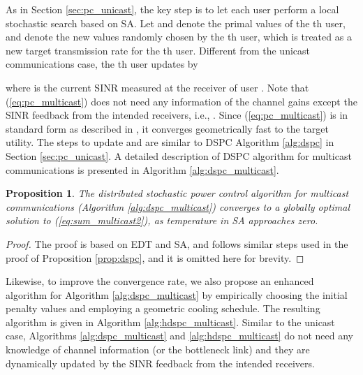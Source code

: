 \documentclass[10pt,journal,letterpaper,compsoc]{IEEEtran}
\newtheorem{prop}{\textbf{Proposition}}[section]
\begin{document}
{{As in Section \ref{sec:pc_unicast}, the key step is to let each user perform a local stochastic search based on SA. Let  and  denote the primal values of the th user, and  denote the new values randomly chosen by the th user, which is treated as a new target transmission rate for the th user. Different from the unicast communications case, the th user updates  by

where  is the current SINR measured at the receiver  of user . Note that (\ref{eq:pc_multicast}) does not need any information of the channel gains except the SINR feedback from the intended receivers, i.e.,  .  Since (\ref{eq:pc_multicast}) is in standard form as described in \cite{yates:1995}, it converges geometrically fast to the target utility. The steps to update  and  are similar to DSPC Algorithm \ref{alg:dspc} in Section \ref{sec:pc_unicast}. A detailed description of DSPC algorithm for multicast communications is presented in Algorithm \ref{alg:dspc_multicast}.

\begin{prop}
\label{prop:dspc_multicast}
The distributed stochastic power control algorithm for multicast communications (Algorithm \ref{alg:dspc_multicast}) converges to a globally optimal solution to (\ref{eq:sum_multicast2}), as temperature  in SA approaches zero.
\end{prop}
\begin{proof}
The proof is based on EDT and SA, and follows similar steps used in the proof of Proposition \ref{prop:dspc}, and it is omitted here for brevity.
\end{proof}

Likewise, to improve the convergence rate, we also propose an enhanced algorithm for Algorithm \ref{alg:dspc_multicast} by empirically choosing the initial penalty values and employing a geometric cooling schedule. The resulting algorithm is given in Algorithm \ref{alg:hdspc_multicast}. Similar to the unicast case, Algorithms \ref{alg:dspc_multicast} and \ref{alg:hdspc_multicast} do not need any knowledge of channel information (or the bottleneck link) and they are dynamically updated by the SINR feedback from the intended receivers.

}}
\end{document}
